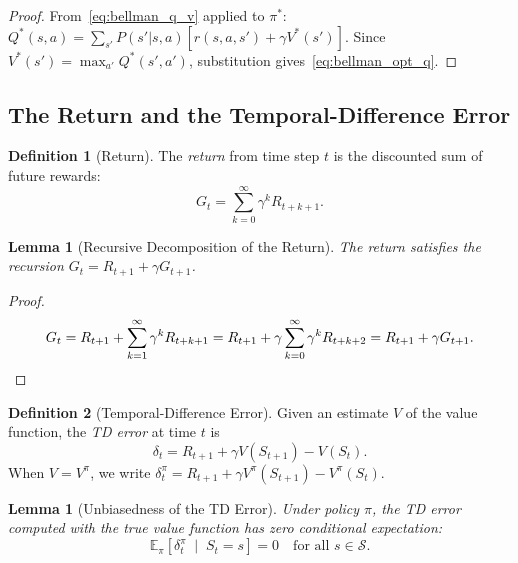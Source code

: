 \documentclass[11pt,a4paper]{article}
\theoremstyle{definition}
\newtheorem{definition}{Definition}[section]
\theoremstyle{plain}
\newtheorem{lemma}[theorem]{Lemma}
\theoremstyle{remark}
\newcommand{\E}{\mathbb{E}}
\begin{document}
\begin{proof}
From~\eqref{eq:bellman_q_v} applied to $\pi^*$: $Q^*(s,a) = \sum_{s'} P(s'|s,a)[r(s,a,s') + \gamma V^*(s')]$. Since $V^*(s') = \max_{a'} Q^*(s',a')$, substitution gives~\eqref{eq:bellman_opt_q}.
\end{proof}

\subsection{The Return and the Temporal-Difference Error}
\label{subsec:return_td}

\begin{definition}[Return]
\label{def:return}
The \emph{return} from time step $t$ is the discounted sum of future rewards:
\begin{equation}
    G_t = \sum_{k=0}^{\infty} \gamma^k R_{t+k+1}.
    \label{eq:return}
\end{equation}
\end{definition}

\begin{lemma}[Recursive Decomposition of the Return]
\label{lem:return_recursive}
The return satisfies the recursion $G_t = R_{t+1} + \gamma G_{t+1}$.
\end{lemma}

\begin{proof}
\begin{equation*}
    G_t = R_{t+1} + \sum_{k=1}^{\infty} \gamma^k R_{t+k+1}
        = R_{t+1} + \gamma \sum_{k=0}^{\infty} \gamma^k R_{t+k+2}
        = R_{t+1} + \gamma G_{t+1}. \qedhere
\end{equation*}
\end{proof}

\begin{definition}[Temporal-Difference Error]
\label{def:td_error}
Given an estimate $V$ of the value function, the \emph{TD error} at time $t$ is
\begin{equation}
    \delta_t = R_{t+1} + \gamma V(S_{t+1}) - V(S_t).
    \label{eq:td_error}
\end{equation}
When $V = V^\pi$, we write $\delta_t^\pi = R_{t+1} + \gamma V^\pi(S_{t+1}) - V^\pi(S_t)$.
\end{definition}

\begin{lemma}[Unbiasedness of the TD Error]
\label{lem:td_unbiased}
Under policy $\pi$, the TD error computed with the true value function has zero conditional expectation:
\begin{equation}
    \E_\pi\!\left[\delta_t^\pi \;\middle|\; S_t = s\right] = 0 \quad \text{for all } s \in \mathcal{S}.
    \label{eq:td_unbiased}
\end{equation}
\end{lemma}
\end{document}
